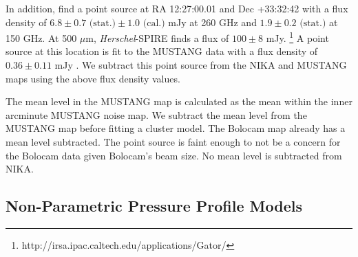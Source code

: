 \documentclass[twocolumn,traditabstract]{aa}
\begin{document}
In addition, \citet{adam2015} find a point source at RA 12:27:00.01 and Dec +33:32:42 with a flux density of 
$6.8 \pm 0.7 \text{ (stat.)} \pm 1.0 \text{ (cal.)}$ mJy at 260 GHz and $1.9 \pm 0.2 \text{ (stat.)}$ at 150 GHz.
At 500 $\mu$m, \emph{Herschel}-SPIRE finds a flux of $100 \pm 8$ mJy.
\footnote{{http://irsa.ipac.caltech.edu/applications/Gator/}} A point source at this location is fit to the MUSTANG
data with a flux density of $0.36 \pm 0.11$ mJy \citep{romero2016}.
We subtract this point source from the NIKA and MUSTANG maps using the above flux density values.


The mean level in the MUSTANG map is calculated as the mean within the inner arcminute MUSTANG noise map. 
We subtract the mean level from the MUSTANG map before fitting a cluster model. The Bolocam map already has
a mean level subtracted.  The point source is faint enough to not be a concern for the Bolocam data given
Bolocam's beam size. No mean level is subtracted from NIKA.

\subsection{Non-Parametric Pressure Profile Models}
\label{sec:np_models}
\end{document}
